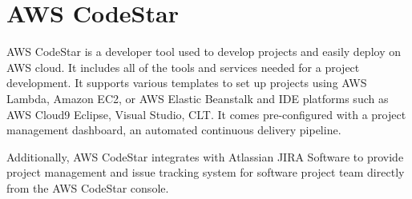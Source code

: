 \section{AWS CodeStar}

AWS CodeStar is a developer tool used to develop projects and easily deploy on 
AWS cloud. It includes all of the tools and services needed for a project 
development. It supports various templates to set up projects using AWS Lambda, Amazon EC2, or AWS Elastic Beanstalk and IDE platforms such as AWS Cloud9 Eclipse, 
Visual Studio, CLT. It comes pre-configured with a project management dashboard, an 
automated continuous delivery pipeline.

Additionally, AWS CodeStar integrates with Atlassian JIRA Software to 
provide project management and issue tracking system for software project 
team directly from the AWS CodeStar console.
\cite{hid-sp18-602-awscodestar-blog} 

